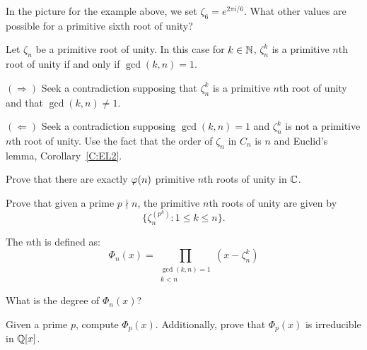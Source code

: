 \documentclass{ximera}
\begin{document}
\begin{exercise}
  In the picture for the example above, we set $\zeta_6 =e^{2\pi
    i/6}$. What other values are possible for a primitive sixth root
  of unity?
\end{exercise}




\begin{theorem} 
Let $\zeta_n$ be a primitive root of unity. In this case for $k\in\mathbb N$,
$\zeta_n^k$ is a primitive $n$th root of unity if and only if
$\gcd(k,n) = 1$.

\begin{sketch} 
$(\Rightarrow)$ Seek a contradiction supposing that $\zeta_n^k$ is a
  primitive $n$th root of unity and that $\gcd(k,n) \ne 1$.

$(\Leftarrow)$ Seek a contradiction supposing $\gcd(k,n) = 1$ and
  $\zeta_n^k$ is not a primitive $n$th root of unity. Use the fact
  that the order of $\zeta_n$ in $C_n$ is $n$ and Euclid's lemma,
  Corollary~\ref{C:EL2}.
\end{sketch}
\end{theorem}



\begin{exercise}
  Prove that there are exactly $\eulerphi(n)$ primitive $n$th roots of
  unity in $\mathbb C$.
\end{exercise}


\begin{exercise}\label{E:KP}
  Prove that given a prime $p\nmid n$, the primitive $n$th roots of
  unity are given by
  \[
  \{\zeta_n^{(p^k)}: 1\le k \le n\}.
  \]
\end{exercise}




\begin{definition}
The $n$th  is defined as:
\[
\Phi_n(x) = \prod_{\substack{\gcd(k,n)=1 \\ k<n}}(x-\zeta_n^k)
\]
\end{definition}

\begin{exercise}
  What is the degree of $\Phi_n(x)$?
\end{exercise}

\begin{exercise}
  Given a prime $p$, compute $\Phi_p(x)$. Additionally, prove that
  $\Phi_p(x)$ is irreducible in $\mathbb Q[x]$.
\end{exercise}
\end{document}
